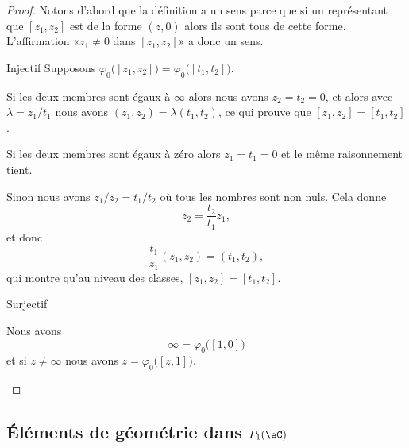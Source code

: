 \begin{proof}
    Notons d'abord que la définition a un sens parce que si un représentant que \( [z_1,z_2]\) est de la forme \( (z,0)\) alors ils sont tous de cette forme. L'affirmation «\( z_1\neq 0\) dans \( [z_1,z_2]\)» a donc un sens.
    \begin{subproof}
        \item[Injectif]
            Supposons \( \varphi_0\big( [z_1,z_2] \big)=\varphi_0\big( [t_1,t_2] \big)\).

            Si les deux membres sont égaux à \( \infty\) alors nous avons \( z_2=t_2=0\), et alors avec \( \lambda=z_1/t_1\) nous avons \( (z_1,z_2)=\lambda (t_1,t_2)\), ce qui prouve que \( [z_1,z_2]=[t_1,t_2]\).

            Si les deux membres sont égaux à zéro alors \( z_1=t_1=0\) et le même raisonnement tient.

            Sinon nous avons \( z_1/z_2=t_1/t_2\) où tous les nombres sont non nuls. Cela donne
            \begin{equation}
                z_2=\frac{ t_2 }{ t_1 }z_1,
            \end{equation}
            et donc
            \begin{equation}
                \frac{ t_1 }{ z_1 }(z_1,z_2)=(t_1,t_2),
            \end{equation}
            qui montre qu'au niveau des classes, \( [z_1,z_2]=[t_1,t_2]\).

        \item[Surjectif]

            Nous avons
            \begin{equation}
                \infty=\varphi_0\big( [1,0] \big)
            \end{equation}
            et si \( z\neq \infty\) nous avons \( z=\varphi_0\big( [z,1] \big)\).
    \end{subproof}
\end{proof}

\subsection{Éléments de géométrie dans \( P_1(\eC)\)}
\label{SUBSECooQPRLooAjMNqp}

